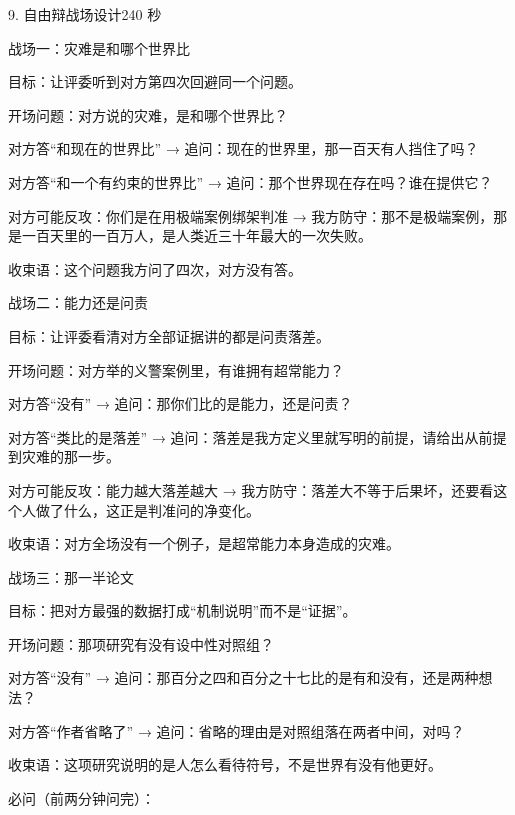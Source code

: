 \documentclass[script,pro]{debate}
\begin{document}
\begin{stage}{9. 自由辩战场设计}{240 秒}
\begin{battleground}{战场一：灾难是和哪个世界比}
\begin{bullets}
\item 目标：让评委听到对方第四次回避同一个问题。
\item 开场问题：对方说的灾难，是和哪个世界比？
\item 对方答“和现在的世界比” → 追问：现在的世界里，那一百天有人挡住了吗？
\item 对方答“和一个有约束的世界比” → 追问：那个世界现在存在吗？谁在提供它？
\item 对方可能反攻：你们是在用极端案例绑架判准 → 我方防守：那不是极端案例，那是一百天里的一百万人，是人类近三十年最大的一次失败。
\item 收束语：这个问题我方问了四次，对方没有答。
\end{bullets}
\end{battleground}
\begin{battleground}{战场二：能力还是问责}
\begin{bullets}
\item 目标：让评委看清对方全部证据讲的都是问责落差。
\item 开场问题：对方举的义警案例里，有谁拥有超常能力？
\item 对方答“没有” → 追问：那你们比的是能力，还是问责？
\item 对方答“类比的是落差” → 追问：落差是我方定义里就写明的前提，请给出从前提到灾难的那一步。
\item 对方可能反攻：能力越大落差越大 → 我方防守：落差大不等于后果坏，还要看这个人做了什么，这正是判准问的净变化。
\item 收束语：对方全场没有一个例子，是超常能力本身造成的灾难。
\end{bullets}
\end{battleground}
\begin{battleground}{战场三：那一半论文}
\begin{bullets}
\item 目标：把对方最强的数据打成“机制说明”而不是“证据”。
\item 开场问题：那项研究有没有设中性对照组？
\item 对方答“没有” → 追问：那百分之四和百分之十七比的是有和没有，还是两种想法？
\item 对方答“作者省略了” → 追问：省略的理由是对照组落在两者中间，对吗？
\item 收束语：这项研究说明的是人怎么看待符号，不是世界有没有他更好。
\end{bullets}
必问（前两分钟问完）：


\end{battleground}
\end{stage}
\end{document}
